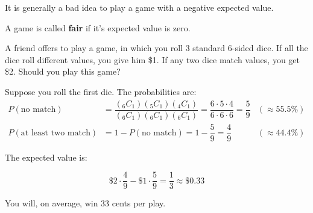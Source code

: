 \documentclass{beamer}
\newcommand{\prob}[1]{P\left(#1\right)}
\newcommand{\comb}[2]{{_{#1}C_{#2}}}
\begin{document}
\begin{frame}
\begin{note}
It is generally a bad idea to play a game with a negative expected value.

\vspace{2mm}
A game is called \textbf{fair} if it's expected value is zero.
\end{note}\pause

\begin{example}
A friend offers to play a game, in which you roll 3 standard 6-sided dice. If all the dice roll different values, you give him \$1. If any two dice match values, you get \$2. Should you play this game?\pause

\vspace{2mm}
Suppose you roll the first die. The probabilities are:
\begin{equation*}
\begin{aligned}
\prob{\text{no match}} &= \dfrac{\left(\comb{6}{1}\right)\left(\comb{5}{1}\right)\left(\comb{4}{1}\right)}{\left(\comb{6}{1}\right)\left(\comb{6}{1}\right)\left(\comb{6}{1}\right)} = \dfrac{6\cdot5\cdot4}{6\cdot6\cdot6} = \dfrac{5}{9} &\left(\approx 55.5\%\right) \\
\prob{\text{at least two match}} &= 1 - \prob{\text{no match}} = 1-\dfrac{5}{9} = \dfrac{4}{9} &\left(\approx 44.4\%\right)
\end{aligned}
\end{equation*}\pause

\vspace{-5mm}
The expected value is:

\vspace{-5mm}
\begin{equation*}
\$2\cdot\dfrac{4}{9} -\$1\cdot\dfrac{5}{9} = \dfrac{1}{3} \approx \$0.33
\end{equation*}

\vspace{-1mm}
You will, on average, win 33 cents per play.
\end{example}
\end{frame}
\end{document}
